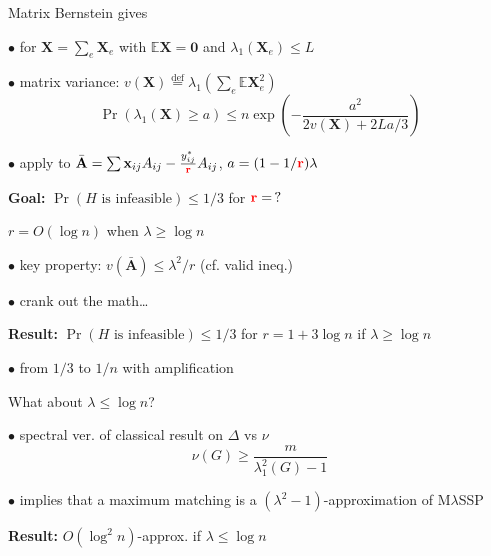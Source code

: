 \documentclass[14pt]{beamer}
\begin{document}
\begin{frame}[noframenumbering]{Matrix Bernstein gives}
\begin{fullpageitemize}
\item $\bullet$ for $\mathbf{X} = \sum_e \mathbf{X}_{e}$ with $\mathbb{E} \mathbf{X} = \mathbf{0}$ and $\lambda_1(\mathbf{X}_e) \leq L$
\item $\bullet$ matrix variance: $v(\mathbf{X}) \stackrel{\text{def}}{=}  \lambda_1(\sum_e \mathbb{E} \mathbf{X}_e^2)$
\begin{equation*}
    \Pr(\lambda_1(\mathbf{X}) \geq a) \leq
n \exp\left(-\dfrac{a^2}{2v(\mathbf{X}) + 2L a/3}\right)
\end{equation*}
\item $\bullet$ apply to $\bar{\mathbf{A}} = \sum \mathbf{x}_{ij} A_{ij} - \frac{y_{ij}^*}{\mathbf{{\color{red} r}}} A_{ij}$, $a = (1 - 1/\mathbf{{\color{red} r}}) \lambda$
\item \textbf{Goal:} $\Pr(H \text{ is infeasible}) \leq 1/3$ for $\mathbf{{\color{red} r}} = \,?$
\end{fullpageitemize}
\end{frame}

\begin{frame}{$r = O(\log n)$ when $\lambda \geq \log n$}
\begin{fullpageitemize}
\item $\bullet$ key property: $v(\bar{\mathbf{A}}) \leq \lambda^2 / r$ (cf. valid ineq.)
\item $\bullet$ crank out the math\ldots
\item \textbf{Result:} $\Pr(H \text{ is infeasible}) \leq 1/3$ for $r = 1 + 3\log n$ if $\lambda \geq \log n$
\item $\bullet$ from $1/3$ to $1/n$ with amplification
\end{fullpageitemize}
\end{frame}

\begin{frame}{What about $\lambda \leq \log n$?}
    \begin{fullpageitemize}
    \item $\bullet$ spectral ver. of classical result on $\Delta$ vs $\nu$ \begin{equation*}
    \nu(G) \geq \frac{m}{\lambda_1^2(G) - 1}
    \end{equation*}
    \item $\bullet$ implies that a maximum matching is a $(\lambda^2 - 1)$-approximation of M$\lambda$SSP
    \item \textbf{Result:} $O(\log^2 n)$-approx. if $\lambda \leq \log n$
    \end{fullpageitemize}
\end{frame}
\end{document}
